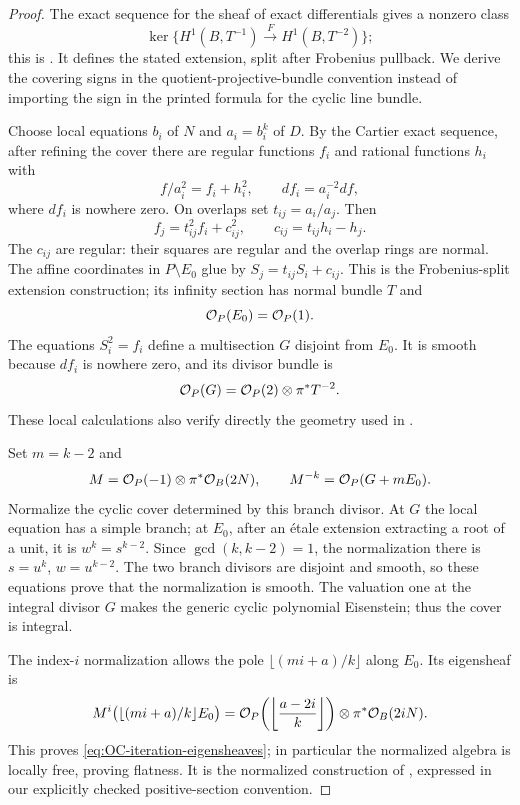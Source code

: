 \begin{proof}
The exact sequence for the sheaf of exact differentials gives a nonzero class
\[
 \ker\{H^1(B,T^{-1})\xrightarrow{F}H^1(B,T^{-2})\};
\]
this is \cite[Theorem~1, Lemma~1.4, and their proofs, pp.~1, 4--5]{Mukai2011Kodaira}.
It defines the stated extension, split after Frobenius pullback.  We derive the covering signs in the quotient-projective-bundle convention instead of importing the sign in the printed formula for the cyclic line bundle.

Choose local equations $b_i$ of $N$ and $a_i=b_i^k$ of $D$.  By the Cartier exact sequence, after refining the cover there are regular functions $f_i$ and rational functions $h_i$ with
\[
       f/a_i^2=f_i+h_i^2,
       \qquad df_i=a_i^{-2}df,
\]
where $df_i$ is nowhere zero.  On overlaps set $t_{ij}=a_i/a_j$.  Then
\[
 f_j=t_{ij}^2f_i+c_{ij}^2,
 \qquad c_{ij}=t_{ij}h_i-h_j.
\]
The $c_{ij}$ are regular: their squares are regular and the overlap rings are normal.  The affine coordinates in $P\setminus E_0$ glue by
$S_j=t_{ij}S_i+c_{ij}$.  This is the Frobenius-split extension construction; its infinity section has normal bundle $T$ and
\[
 \mathcal O_P(E_0)=\mathcal O_P(1).
\]
The equations $S_i^2=f_i$ define a multisection $G$ disjoint from $E_0$.  It is smooth because $df_i$ is nowhere zero, and its divisor bundle is
\[
             \mathcal O_P(G)=\mathcal O_P(2)\otimes\pi^*T^{-2}.
\]
These local calculations also verify directly the geometry used in
\cite[Proposition~1.7 and its proof, pp.~5--6]{Mukai2011Kodaira}.

Set $m=k-2$ and
\[
 M=\mathcal O_P(-1)\otimes\pi^*\mathcal O_B(2N),
 \qquad M^{-k}=\mathcal O_P(G+mE_0).
\]
Normalize the cyclic cover determined by this branch divisor.  At $G$ the local equation has a simple branch; at $E_0$, after an \'etale extension extracting a root of a unit, it is $w^k=s^{k-2}$.  Since $\gcd(k,k-2)=1$, the normalization there is $s=u^k$, $w=u^{k-2}$.  The two branch divisors are disjoint and smooth, so these equations prove that the normalization is smooth.  The valuation one at the integral divisor $G$ makes the generic cyclic polynomial Eisenstein; thus the cover is integral.

The index-$i$ normalization allows the pole
$\lfloor(mi+a)/k\rfloor$ along $E_0$.  Its eigensheaf is
\[
 M^i\bigl(\lfloor(mi+a)/k\rfloor E_0\bigr)
 =\mathcal O_P\!\left(\left\lfloor\frac{a-2i}{k}\right\rfloor\right)
                      \otimes\pi^*\mathcal O_B(2iN).
\]
This proves \eqref{eq:OC-iteration-eigensheaves}; in particular the normalized algebra is locally free, proving flatness.  It is the normalized construction of \cite[Definition~2.1, p.~7]{Mukai2011Kodaira}, expressed in our explicitly checked positive-section convention.


\end{proof}
